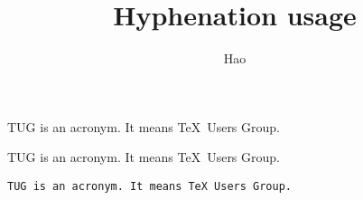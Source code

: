 \documentclass[a4paper,10pt]{article}
\title{Hyphenation usage}
\author{Hao}
\begin{document}
\maketitle
\parbox{3cm}{TUG is an acronym. It means \TeX\ Users Group.}
\quad
\parbox{3cm}{TUG is an \mbox{acronym}. It means \TeX\ Users Group.}
\quad
\parbox{3cm}{\texttt{TUG is an acronym. It means \TeX\ Users Group.}}
\end{document}

